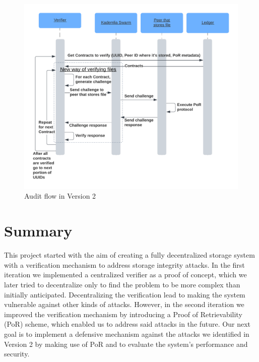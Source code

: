 \begin{figure}
    \centering
    \includegraphics[width=1\textwidth]{gfx/verify-procedure-v2.png}
    \caption{Audit flow in Version 2}
    \label{fig:verify-procedure-v2}
\end{figure}

\section{Summary}

This project started with the aim of creating a fully decentralized storage system with a verification mechanism
to address storage integrity attacks.
In the first iteration we implemented a centralized verifier as a proof of concept,
which we later tried to decentralize only to find the problem to be more complex than initially anticipated.
Decentralizing the verification lead to making the system vulnerable against other kinds of attacks.
However, in the second iteration we improved the verification mechanism by introducing a
Proof of Retrievability (PoR) scheme,
which enabled us to address said attacks in the future.
Our next goal is to implement a defensive mechanism against the attacks we identified in Version 2
by making use of PoR and to evaluate the system's performance and security.

